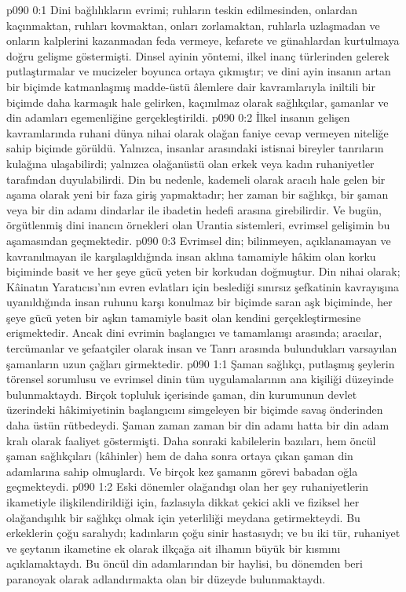 \vs p090 0:1 Dini bağlılıkların evrimi; ruhların teskin edilmesinden, onlardan kaçınmaktan, ruhları kovmaktan, onları zorlamaktan, ruhlarla uzlaşmadan ve onların kalplerini kazanmadan feda vermeye, kefarete ve günahlardan kurtulmaya doğru gelişme göstermişti. Dinsel ayinin yöntemi, ilkel inanç türlerinden gelerek putlaştırmalar ve mucizeler boyunca ortaya çıkmıştır; ve dini ayin insanın artan bir biçimde katmanlaşmış madde\hyp{}üstü âlemlere dair kavramlarıyla iniltili bir biçimde daha karmaşık hale gelirken, kaçınılmaz olarak sağlıkçılar, şamanlar ve din adamları egemenliğine gerçekleştirildi.
\vs p090 0:2 İlkel insanın gelişen kavramlarında ruhani dünya nihai olarak olağan faniye cevap vermeyen niteliğe sahip biçimde görüldü. Yalnızca, insanlar arasındaki istisnai bireyler tanrıların kulağına ulaşabilirdi; yalnızca olağanüstü olan erkek veya kadın ruhaniyetler tarafından duyulabilirdi. Din bu nedenle, kademeli olarak aracılı hale gelen bir aşama olarak yeni bir faza giriş yapmaktadır; her zaman bir sağlıkçı, bir şaman veya bir din adamı dindarlar ile ibadetin hedefi arasına girebilirdir. Ve bugün, örgütlenmiş dini inancın örnekleri olan Urantia sistemleri, evrimsel gelişimin bu aşamasından geçmektedir.
\vs p090 0:3 Evrimsel din; bilinmeyen, açıklanamayan ve kavranılmayan ile karşılaşıldığında insan aklına tamamiyle hâkim olan korku biçiminde basit ve her şeye gücü yeten bir korkudan doğmuştur. Din nihai olarak; Kâinatın Yaratıcısı’nın evren evlatları için beslediği sınırsız şefkatinin kavrayışına uyanıldığında insan ruhunu karşı konulmaz bir biçimde saran aşk biçiminde, her şeye gücü yeten bir aşkın tamamiyle basit olan kendini gerçekleştirmesine erişmektedir. Ancak dini evrimin başlangıcı ve tamamlanışı arasında; aracılar, tercümanlar ve şefaatçiler olarak insan ve Tanrı arasında bulundukları varsayılan şamanların uzun çağları girmektedir.
\vs p090 1:1 Şaman sağlıkçı, putlaşmış şeylerin törensel sorumlusu ve evrimsel dinin tüm uygulamalarının ana kişiliği düzeyinde bulunmaktaydı. Birçok topluluk içerisinde şaman, din kurumunun devlet üzerindeki hâkimiyetinin başlangıcını simgeleyen bir biçimde savaş önderinden daha üstün rütbedeydi. Şaman zaman zaman bir din adamı hatta bir din adam kralı olarak faaliyet göstermişti. Daha sonraki kabilelerin bazıları, hem öncül şaman sağlıkçıları (kâhinler) hem de daha sonra ortaya çıkan şaman din adamlarına sahip olmuşlardı. Ve birçok kez şamanın görevi babadan oğla geçmekteydi.
\vs p090 1:2 Eski dönemler olağandışı olan her şey ruhaniyetlerin ikametiyle ilişkilendirildiği için, fazlasıyla dikkat çekici akli ve fiziksel her olağandışılık bir sağlıkçı olmak için yeterliliği meydana getirmekteydi. Bu erkeklerin çoğu saralıydı; kadınların çoğu sinir hastasıydı; ve bu iki tür, ruhaniyet ve şeytanın ikametine ek olarak ilkçağa ait ilhamın büyük bir kısmını açıklamaktaydı. Bu öncül din adamlarından bir haylisi, bu dönemden beri paranoyak olarak adlandırmakta olan bir düzeyde bulunmaktaydı.

